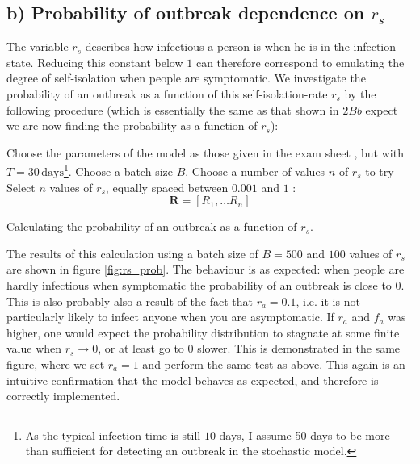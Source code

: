 \subsection{b) Probability of outbreak dependence on $r_s$}

The variable $r_s$ describes how infectious a person is when he is in the infection state. Reducing this constant below $1$ can therefore correspond to emulating the degree of self-isolation when people are symptomatic. We investigate the probability of an outbreak as a function of this self-isolation-rate $r_s$ by the following procedure (which is essentially the same as that shown in $2Bb$ expect we are now finding the probability as a function of $r_s$): 

\begin{algorithm}[H]
	Choose the parameters of the model as those given in the exam sheet \cite{sheet}, but with $T = 30 \, \mathrm{days}$\footnote{As the typical infection time is still $10$ days, I assume 50 days to be more than sufficient for detecting an outbreak in the stochastic model.}. \;
	Choose a batch-size $B$.\;
	Choose a number of values $n$ of $r_s$ to try\;
	Select $n$ values of $r_s$, equally spaced between $0.001$ and $1$ :
		$$
			\mathbf{R} = [R_1, \dots R_n]
		$$
	\caption{Calculating the probability of an outbreak as a function of $r_s$.}
\end{algorithm} 

The results of this calculation using a batch size of $B = 500$ and $100$ values of $r_s$ are shown in figure \ref{fig:rs_prob}. The behaviour is as expected: when people are hardly infectious when symptomatic the probability of an outbreak is close to $0$. This is also probably also a result of the fact that $r_a = 0.1$, i.e. it is not particularly likely to infect anyone when you are asymptomatic. If $r_a$ and $f_a$ was higher, one would expect the probability distribution to stagnate at some finite value when $r_s \to 0$, or at least go to $0$ slower. This is demonstrated in the same figure, where we set $r_a = 1$ and perform the same test as above. This again is an intuitive confirmation that the model behaves as expected, and therefore is correctly implemented.

